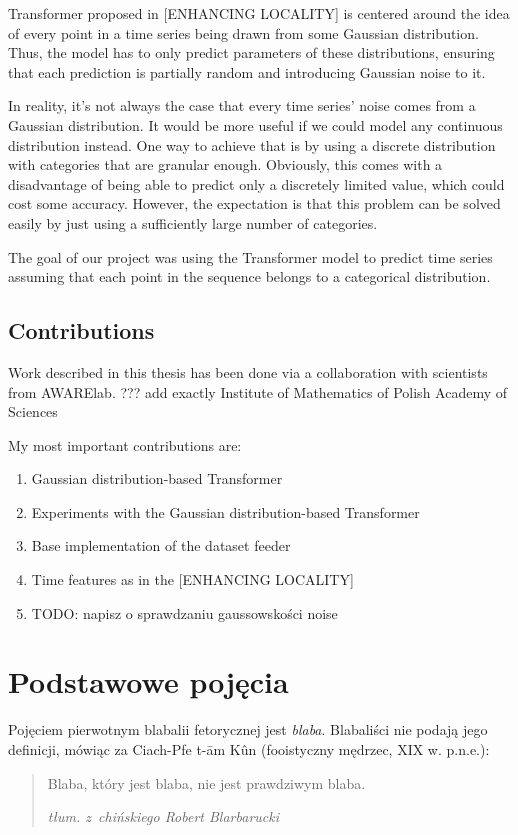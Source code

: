 \documentclass[en]{pracamgr}
\begin{document}
Transformer proposed in [ENHANCING LOCALITY] is centered around the idea of every point in a time series being drawn from some Gaussian distribution. Thus, the model has to only predict parameters of these distributions, ensuring that each prediction is partially random and introducing Gaussian noise to it.

In reality, it's not always the case that every time series' noise comes from a Gaussian distribution.
It would be more useful if we could model any continuous distribution instead. One way to achieve that is by using a discrete distribution with categories that are granular enough. Obviously, this comes with a disadvantage of being able to predict only a discretely limited value, which could cost some accuracy. However, the expectation is that this problem can be solved easily by just using a sufficiently large number of categories.

The goal of our project was using the Transformer model to predict time series assuming that each point in the sequence belongs to a categorical distribution.



\section{Contributions}\label{r:contributions}

Work described in this thesis has been done via a collaboration with scientists from AWARElab. ??? add exactly Institute of Mathematics of Polish Academy of Sciences

My most important contributions are:
\begin{enumerate}
	\item Gaussian distribution-based Transformer
	\item Experiments with the Gaussian distribution-based Transformer
	\item Base implementation of the dataset feeder
	\item Time features as in the [ENHANCING LOCALITY]
	\item TODO: napisz o sprawdzaniu gaussowskości noise
\end{enumerate}

\chapter{Podstawowe pojęcia}\label{r:pojecia}

Pojęciem pierwotnym blabalii fetorycznej jest \emph{blaba}.
Blabaliści nie podają jego definicji, mówiąc za Ciach-Pfe t-\=am
K\^un (fooistyczny mędrzec, XIX w. p.n.e.):
\begin{quote}
  Blaba, który jest blaba, nie jest prawdziwym blaba.

\raggedleft\slshape tłum. z~chińskiego Robert Blarbarucki
\end{quote}
\end{document}
